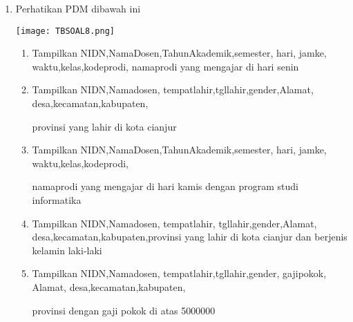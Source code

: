 \documentclass[12pt,a4paper]{article}
\newcommand{\codeListing}[1] {  }
\begin{document}
\begin{enumerate}
\begin{enumerate}
        \end{enumerate}

      \newpage

      \item Perhatikan PDM dibawah ini

        \begin{center}
          \texttt{[image: TBSOAL8.png]}
        \end{center}

        \begin{enumerate}

          \item Tampilkan NIDN,NamaDosen,TahunAkademik,semester, hari, jamke, 
            waktu,kelas,kodeprodi, namaprodi yang mengajar di hari senin

            \codeListing{1}

          \item Tampilkan NIDN,Namadosen, tempatlahir,tgllahir,gender,Alamat,
            desa,kecamatan,kabupaten,

            provinsi yang lahir di kota cianjur

            \codeListing{2}

          \item Tampilkan NIDN,NamaDosen,TahunAkademik,semester, hari, jamke,
            waktu,kelas,kodeprodi,

            namaprodi yang mengajar di hari kamis dengan
            program studi informatika

            \codeListing{3}

          \item Tampilkan NIDN,Namadosen, tempatlahir,
            tgllahir,gender,Alamat, desa,kecamatan,kabupaten,provinsi
            yang lahir di kota cianjur dan berjenis kelamin laki-laki

            \codeListing{4}

          \item Tampilkan NIDN,Namadosen, tempatlahir,tgllahir,gender, gajipokok,
            Alamat, desa,kecamatan,kabupaten,

            provinsi dengan gaji pokok di atas 5000000

            \codeListing{5}

        \end{enumerate}

    \end{enumerate}
  
\end{document}
